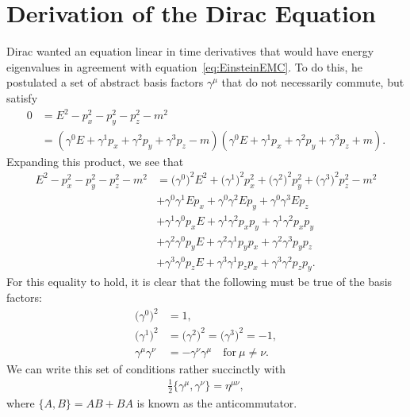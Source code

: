 \documentclass[titlepage,letterpaper,onecolumn,11pt,final]{report}
\newcommand{\gama}{\gamma^{0}}
\newcommand{\gamb}{\gamma^{1}}
\newcommand{\gamc}{\gamma^{2}}
\newcommand{\gamd}{\gamma^{3}}
\numberwithin{equation}{section}
\numberwithin{figure}{section}
\begin{document}
\section{Derivation of the Dirac Equation}

Dirac wanted an equation linear in time derivatives that would have energy eigenvalues in agreement with equation~\ref{eq:EinsteinEMC}. To do this, he postulated a set of abstract basis factors $\gamma^{\mu}$ that do not necessarily commute, but satisfy
\begin{equation}
	\begin{split}
	\label{eq:dirac_precursor}
	0 &= E^{2} - p_{x}^{2} - p_{y}^{2} - p_{z}^{2} - m^{2} \\
	&= \left(  \gama E + \gamb p_{x} + \gamc p_{y} + \gamd p_{z} - m \right) \left( \gama E + \gamb p_{x} + \gamc p_{y} + \gamd p_{z} + m \right) .
	\end{split}
\end{equation}
%
Expanding this product, we see that
\begin{equation}
	\begin{split}
	\label{eq:expanded}
	E^{2} - p_{x}^{2} - p_{y}^{2} - p_{z}^{2} - m^{2} &= \big(\gama \big)^{2} E^{2} + \big( \gamb \big)^{2} p_{x}^{2} + \big( \gamc \big)^{2} p_{y}^{2} + \big( \gamd \big)^{2} p_{z}^{2} - m^{2} \\
	&+ \gama \gamb E p_{x} + \gama \gamc E p_{y}     + \gama \gamd E p_{z}      \\
	&+ \gamb \gama p_{x} E + \gamb \gamc p_{x} p_{y} + \gamb \gamc p_{x} p_{y}  \\
	&+ \gamc \gama p_{y} E + \gamc \gamb p_{y} p_{x} + \gamc \gamd p_{y} p_{z}  \\
	&+ \gamd \gama p_{z} E + \gamd \gamb p_{z} p_{x} + \gamd \gamc p_{z} p_{y} .
	\end{split}
\end{equation}
%
For this equality to hold, it is clear that the following must be true of the basis factors:
\begin{subequations}
\begin{align}
	\label{clifford1}
	\big( \gama \big)^{2} &= 1 ,\\
	\label{clifford2}
	\big( \gamb \big)^{2} &= \big( \gamc \big)^{2} = \big( \gamd \big)^{2} = -1 , \\
	\label{clifford3}
	\gamma^{\mu} \gamma^{\nu} &= - \gamma^{\nu} \gamma^{\mu} \quad \text{for} \ \mu \neq \nu .
\end{align}
\end{subequations}
%
We can write this set of conditions rather succinctly with
\begin{gather}
	\label{clifford_anticommutator}
	\frac{1}{2} \{ \gamma^{\mu} , \gamma^{\nu} \} = \eta^{\mu \nu} ,
\end{gather}
where $\{A,B\} = AB + BA$ is known as the anticommutator.
\end{document}
